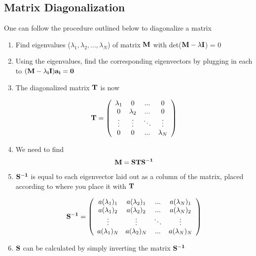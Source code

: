 \subsection{Matrix Diagonalization}\label{diagonalize}
One can follow the procedure outlined below to diagonalize a matrix\cite{griffiths_qm}

\begin{enumerate}
\item Find eigenvalues ($\lambda_1, \lambda_2, ... , \lambda_N$) of matrix $\bf{M}$ with det($\bf{M}-\lambda\bf{I}$) = 0
\item Using the eigenvalues, find the corresponding eigenvectors by plugging in each to $(\bf{M}-\lambda_i\bf{I})\bf{a_i} = 0$
\item The diagonalized matrix $\bf{T}$ is now 

$$\bf{T} = \left(
{\begin{array}{cccc}
\lambda_1 & 0 &...&0 \\
0 & \lambda_2 & ...&0\\
\vdots & \vdots &\ddots & \vdots \\
0 & 0 & ... &\lambda_N
\end{array}}
\right)
$$

\item We need to find$$ \bf{M} = \bf{STS^{-1}}$$
\item $\bf{S^{-1}}$ is equal to each eigenvector laid out as a column of the matrix, placed according to where you place it with $\bf{T}$

$$\bf{S^{-1}} = \left(
{\begin{array}{cccc}
a(\lambda_1)_1 & a(\lambda_2)_1 &...&a(\lambda_N)_1 \\
a(\lambda_1)_2 & a(\lambda_2)_2 & ...&a(\lambda_N)_2\\
\vdots & \vdots &\ddots & \vdots \\
a(\lambda_1)_N & a(\lambda_2)_N & ... &a(\lambda_N)_N
\end{array}}
\right)
$$

\item $\bf{S}$ can be calculated by simply inverting the matrix $\bf{S^{-1}}$
\end{enumerate}

